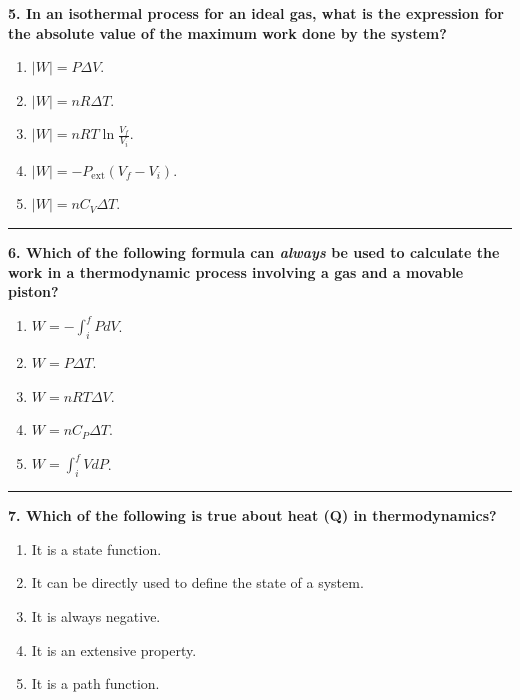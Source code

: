 \documentclass[
  9pt,
]{extbook}
\providecommand{\tightlist}{%
  \setlength{\itemsep}{0pt}\setlength{\parskip}{0pt}}
\theoremstyle{definition}
\theoremstyle{definition}
\theoremstyle{definition}
\theoremstyle{definition}
\theoremstyle{remark}
\begin{document}
\textbf{5. In an isothermal process for an ideal gas, what is the expression for the absolute value of the maximum work done by the system?}

\begin{enumerate}
\def\labelenumi{\alph{enumi}.}
\tightlist
\item
  \(\left| W \right|=P\Delta V\).
\item
  \(\left| W \right|=nR \Delta T\).
\item
  \(\left| W \right|=nRT\ln\frac{V_f}{V_i}\).
\item
  \(\left| W \right|=-P_{\text{ext}}(V_f-V_i)\).
\item
  \(\left| W \right|=nC_V \Delta T\).
\end{enumerate}

\begin{center}\rule{0.5\linewidth}{0.5pt}\end{center}

\textbf{6. Which of the following formula can \emph{always} be used to calculate the work in a thermodynamic process involving a gas and a movable piston?}

\begin{enumerate}
\def\labelenumi{\alph{enumi}.}
\tightlist
\item
  \(W= - \int_{i}^{f} PdV\).
\item
  \(W = P \Delta T\).
\item
  \(W = nRT \Delta V\).
\item
  \(W = nC_P \Delta T\).
\item
  \(W = \int_{i}^{f} VdP\).
\end{enumerate}

\begin{center}\rule{0.5\linewidth}{0.5pt}\end{center}

\textbf{7. Which of the following is true about heat (Q) in thermodynamics?}

\begin{enumerate}
\def\labelenumi{\alph{enumi}.}
\tightlist
\item
  It is a state function.
\item
  It can be directly used to define the state of a system.
\item
  It is always negative.
\item
  It is an extensive property.
\item
  It is a path function.
\end{enumerate}
\end{document}
